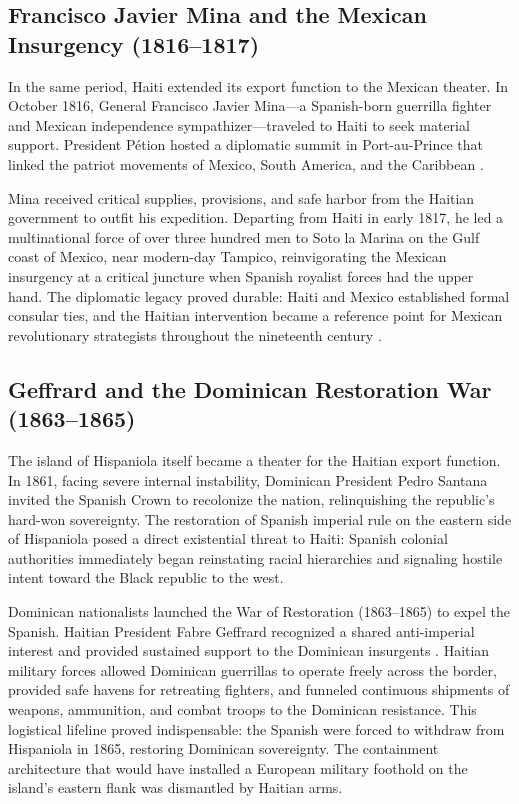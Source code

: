 \subsection{Francisco Javier Mina and the Mexican Insurgency (1816--1817)}

In the same period, Haiti extended its export function to the Mexican theater. In October 1816, General Francisco Javier Mina---a Spanish-born guerrilla fighter and Mexican independence sympathizer---traveled to Haiti to seek material support. President Pétion hosted a diplomatic summit in Port-au-Prince that linked the patriot movements of Mexico, South America, and the Caribbean \cite{james_black_jacobins}.

Mina received critical supplies, provisions, and safe harbor from the Haitian government to outfit his expedition. Departing from Haiti in early 1817, he led a multinational force of over three hundred men to Soto la Marina on the Gulf coast of Mexico, near modern-day Tampico, reinvigorating the Mexican insurgency at a critical juncture when Spanish royalist forces had the upper hand. The diplomatic legacy proved durable: Haiti and Mexico established formal consular ties, and the Haitian intervention became a reference point for Mexican revolutionary strategists throughout the nineteenth century \cite{james_black_jacobins}.

\subsection{Geffrard and the Dominican Restoration War (1863--1865)}

The island of Hispaniola itself became a theater for the Haitian export function. In 1861, facing severe internal instability, Dominican President Pedro Santana invited the Spanish Crown to recolonize the nation, relinquishing the republic's hard-won sovereignty. The restoration of Spanish imperial rule on the eastern side of Hispaniola posed a direct existential threat to Haiti: Spanish colonial authorities immediately began reinstating racial hierarchies and signaling hostile intent toward the Black republic to the west.

Dominican nationalists launched the War of Restoration (1863--1865) to expel the Spanish. Haitian President Fabre Geffrard recognized a shared anti-imperial interest and provided sustained support to the Dominican insurgents \cite{haiti_constitution_1805}. Haitian military forces allowed Dominican guerrillas to operate freely across the border, provided safe havens for retreating fighters, and funneled continuous shipments of weapons, ammunition, and combat troops to the Dominican resistance. This logistical lifeline proved indispensable: the Spanish were forced to withdraw from Hispaniola in 1865, restoring Dominican sovereignty. The containment architecture that would have installed a European military foothold on the island's eastern flank was dismantled by Haitian arms.

